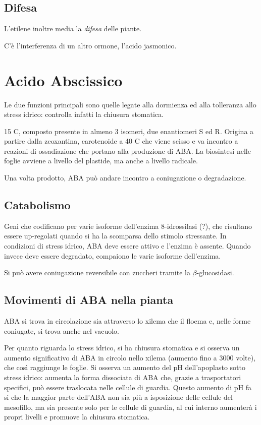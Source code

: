 \documentclass[a4paper,12pt]{book}
\begin{document}
\section{Difesa}
L'etilene inoltre media la \emph{difesa} delle piante.

C'è l'interferenza di un altro ormone, l'acido jasmonico.

\chapter{Acido Abscissico} 
Le due funzioni principali sono quelle legate alla dormienza ed alla tolleranza allo stress idrico: controlla infatti la chiusura stomatica.

15 C, composto presente in almeno 3 isomeri, due enantiomeri S ed R. Origina a partire dalla zeoxantina, carotenoide a 40 C che viene scisso e va incontro a reazioni di ossadiazione che portano alla produzione di ABA. La biosintesi nelle foglie avviene a livello del plastide, ma anche a livello radicale.

Una volta prodotto, ABA può andare incontro a coniugazione o degradazione.

\section{Catabolismo}
Geni che codificano per varie isoforme dell'enzima 8-idrossilasi (?), che risultano essere up-regolati quando si ha la scomparsa dello stimolo stressante. In condizioni di stress idrico, ABA deve essere attivo e l'enzima è assente. Quando invece deve essere degradato, compaiono le varie isoforme dell'enzima.

Si può avere coniugazione reversibile con zuccheri tramite la $\beta$-glucosidasi.


\section{Movimenti di ABA nella pianta}
ABA si trova in circolazione sia attraverso lo xilema che il floema e, nelle forme coniugate, si trova anche nel vacuolo.

Per quanto riguarda lo stress idrico, si ha chiusura stomatica e si osserva un aumento significativo di ABA in circolo nello xilema (aumento fino a 3000 volte), che così raggiunge le foglie. Si osserva un aumento del pH dell'apoplasto sotto stress idrico: aumenta la forma dissociata di ABA che, grazie a trasportatori specifici, può essere traslocata nelle cellule di guardia. Questo aumento di pH fa si che la maggior parte dell'ABA non sia più a isposizione delle cellule del mesofillo, ma sia presente solo per le cellule di guardia, al cui interno aumenterà i propri livelli e promuove la chiusura stomatica.
\end{document}
